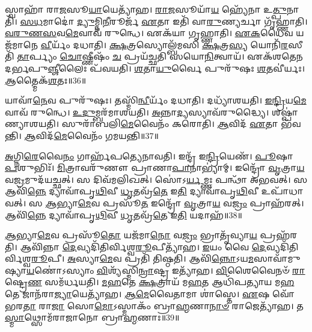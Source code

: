 𑌸𑍍𑌵𑌾𑌹𑌾᳴ 𑌰𑌾\-\ul{𑌜}\-𑌸𑍂\-\ul{𑌯𑌾}\-𑌯𑍇𑌤𑍍𑌯𑌾᳴𑌹।
\-\ul{𑌰𑌾}\-\-\ul{𑌜}\-𑌸𑍂𑌯𑌾᳴\-\ul{𑌯} 𑌹𑍍𑌯𑍇᳴𑌨𑌾 𑌉\-\ul{𑌤𑍍𑌪𑍁}\-𑌨𑌾𑌤𑌿᳴।
\-\ul{𑌸}\-\-\ul{𑌧}\-𑌮𑌾𑌦𑍋॑ \ul{𑌦𑍍𑌯𑍁}\-𑌮𑍍𑌨𑌿\-\ul{𑌨𑍀}\-𑌰𑍂𑌰𑍍𑌜᳴ \ul{𑌏}\-𑌤𑌾 𑌇𑌤𑌿᳴ 𑌵𑌾\-\ul{𑌰𑍁}\-𑌣𑍍𑌯𑌰𑍍𑌚𑌾 𑌗𑍃᳴𑌹𑍍𑌣𑌾𑌤𑌿।
\-\ul{𑌵}\-\-\ul{𑌰𑍁}\-\-\ul{𑌣}\-\-\ul{𑌸}\-𑌵\-\ul{𑌮𑍇}\-𑌵𑌾𑌵᳴ 𑌰𑍁𑌨𑍍𑌧𑍇।
𑌏𑌕᳴𑌯𑌾 𑌗𑍃𑌹𑍍𑌣𑌾𑌤𑌿।
\-\ul{𑌏}\-\-\ul{𑌕}\-𑌧𑍈𑌵 𑌯𑌜᳴𑌮𑌾𑌨𑍇 \ul{𑌵𑍀}\-𑌰𑍍𑌯𑌂᳴ 𑌦𑌧𑌾𑌤𑌿।
\-\ul{𑌕𑍍𑌷}\-𑌤𑍍𑌰𑌸𑍍𑌯𑍋𑌲𑍍𑌬᳴𑌮𑌸𑌿 \ul{𑌕𑍍𑌷}\-𑌤𑍍𑌰\-\ul{𑌸𑍍𑌯} 𑌯𑍋𑌨𑌿᳴\-\ul{𑌰}\-𑌸𑍀𑌤𑌿᳴ \ul{𑌤𑌾}\-𑌰𑍍𑌪𑍍𑌯𑌂 \ul{𑌚𑍋}\-𑌷𑍍𑌣𑍀𑌷𑌂᳴ \ul{𑌚} 𑌪𑍍𑌰𑌯᳴𑌚𑍍𑌛𑌤𑌿 𑌸𑌯𑍋\-\ul{𑌨𑌿}\-𑌤𑍍𑌵𑌾𑌯᳴।
𑌏𑌕᳴𑌶𑌤𑍇𑌨 𑌦𑌰𑍍𑌭𑌪𑍁\-\ul{𑌞𑍍𑌜𑍀}\-𑌲𑍈𑌃 𑌪᳴𑌵𑌯𑌤𑌿।
\-\ul{𑌶}\-𑌤𑌾\-\ul{𑌯𑍁}\-𑌰𑍍𑌵𑍈 𑌪𑍁𑌰𑍁᳴𑌷𑌃 \ul{𑌶}\-𑌤𑌵𑍀॑𑌰𑍍𑌯𑌃।
\-\ul{𑌆}\-𑌤𑍍𑌮𑍈𑌕᳴\-\ul{𑌶}\-𑌤𑌃॥36॥

𑌯𑌾𑌵𑌾᳴\-\ul{𑌨𑍇}\-𑌵 𑌪𑍁𑌰𑍁᳴𑌷𑌃।
𑌤𑌸𑍍𑌮𑌿᳴\-\ul{𑌨𑍍𑌵𑍀}\-𑌰𑍍𑌯𑌂᳴ 𑌦𑌧𑌾𑌤𑌿।
𑌦𑌧𑍍𑌯𑌾᳴𑌶𑌯𑌤𑌿।
\-\ul{𑌇}\-\-\ul{𑌨𑍍𑌦𑍍𑌰𑌿}\-𑌯\-\ul{𑌮𑍇}\-𑌵𑌾𑌵᳴ 𑌰𑍁𑌨𑍍𑌧𑍇।
\-\ul{𑌉}\-\-\ul{𑌦𑍁}\-𑌮𑍍𑌬𑌰᳴𑌮𑌾𑌶𑌯𑌤𑌿।
\-\ul{𑌅}\-𑌨𑍍𑌨𑌾\-\ul{𑌦𑍍𑌯}\-𑌸𑍍𑌯𑌾𑌵᳴𑌰𑍁𑌦𑍍𑌧𑍍𑌯𑍈।
𑌶𑌷𑍍𑌪𑌾॑𑌣𑍍𑌯𑌾𑌶𑌯𑌤𑌿।
𑌸𑍁𑌰𑌾᳴𑌬𑌲𑌿\-\ul{𑌮𑍇}\-𑌵𑍈𑌨𑌂᳴ 𑌕𑌰𑍋𑌤𑌿।
\-\ul{𑌆}\-𑌵𑌿𑌦᳴ \ul{𑌏}\-𑌤𑌾 𑌭᳴𑌵𑌨𑍍𑌤𑌿।
\-\ul{𑌆}\-𑌵𑌿𑌦᳴\-\ul{𑌮𑍇}\-𑌵𑍈𑌨𑌂᳴ 𑌗𑌮𑌯𑌨𑍍𑌤𑌿॥37॥

\-\ul{𑌅}\-𑌗𑍍𑌨𑌿\-\ul{𑌰𑍇}\-𑌵𑍈\-\ul{𑌨𑌂} 𑌗𑌾𑌰𑍍\mbox{}𑌹᳴𑌪𑌤𑍍𑌯𑍇𑌨𑌾𑌵𑌤𑌿।
𑌇𑌨𑍍𑌦𑍍𑌰᳴ 𑌇\-\ul{𑌨𑍍𑌦𑍍𑌰𑌿}\-𑌯𑍇𑌣᳴।
\-\ul{𑌪𑍂}\-𑌷𑌾 \ul{𑌪}\-𑌶𑍁𑌭𑌿𑌃᳴।
\-\ul{𑌮𑌿}\-𑌤𑍍𑌰𑌾𑌵𑌰𑍁᳴𑌣𑍗 𑌪𑍍𑌰𑌾𑌣𑌾\-\ul{𑌪𑌾}\-𑌨𑌾𑌭𑍍𑌯𑌾॑𑌮𑍍।
𑌇𑌨𑍍𑌦𑍍𑌰𑍋᳴ \ul{𑌵𑍃}\-𑌤𑍍𑌰𑌾\-\ul{𑌯} 𑌵\-\ul{𑌜𑍍𑌰}\-𑌮𑍁𑌦᳴𑌯𑌚𑍍𑌛𑌤𑍍।
𑌸 𑌦𑌿𑌵᳴𑌮𑌲𑌿𑌖𑌤𑍍।
𑌸𑍋॑𑌽\-\ul{𑌰𑍍𑌯}\-𑌮𑍍𑌣𑌃 𑌪𑌨𑍍𑌥𑌾᳴ 𑌅𑌭𑌵𑌤𑍍।
𑌸 𑌆𑌵𑌿᳴\-\ul{𑌨𑍍𑌨𑍇} 𑌦𑍍𑌯𑌾𑌵𑌾᳴𑌪𑍃\-\ul{𑌥𑌿}\-𑌵𑍀 \ul{𑌧𑍃}\-𑌤𑌵𑍍𑌰᳴\-\ul{𑌤𑍇} 𑌇\-\ul{𑌤𑌿} 𑌦𑍍𑌯𑌾𑌵𑌾᳴𑌪𑍃\-\ul{𑌥𑌿}\-𑌵𑍀 𑌉𑌪𑌾᳴𑌧𑌾𑌵𑌤𑍍।
𑌸 \ul{𑌆}\-𑌭𑍍𑌯𑌾\-\ul{𑌮𑍇}\-𑌵 𑌪𑍍𑌰𑌸𑍂᳴\-\ul{𑌤} 𑌇𑌨𑍍𑌦𑍍𑌰𑍋᳴ \ul{𑌵𑍃}\-𑌤𑍍𑌰𑌾\-\ul{𑌯} 𑌵\-\ul{𑌜𑍍𑌰𑌂} 𑌪𑍍𑌰𑌾𑌹᳴𑌰𑌤𑍍।
𑌆𑌵𑌿᳴\-\ul{𑌨𑍍𑌨𑍇} 𑌦𑍍𑌯𑌾𑌵𑌾᳴𑌪𑍃\-\ul{𑌥𑌿}\-𑌵𑍀 \ul{𑌧𑍃}\-𑌤𑌵𑍍𑌰᳴\-\ul{𑌤𑍇} 𑌇\-\ul{𑌤𑌿} 𑌯𑌦𑌾𑌹᳴॥38॥

\-\ul{𑌆}\-𑌭𑍍𑌯𑌾\-\ul{𑌮𑍇}\-𑌵 𑌪𑍍𑌰𑌸𑍂᳴\-\ul{𑌤𑍋} 𑌯𑌜᳴𑌮𑌾\-\ul{𑌨𑍋} 𑌵\-\ul{𑌜𑍍𑌰𑌂} 𑌭𑍍𑌰𑌾𑌤𑍃᳴𑌵𑍍𑌯𑌾\-\ul{𑌯} 𑌪𑍍𑌰𑌹᳴𑌰𑌤𑌿।
𑌆𑌵𑌿᳴𑌨𑍍𑌨𑌾 \ul{𑌦𑍇}\-𑌵𑍍𑌯𑌦𑌿᳴𑌤𑌿𑌰𑍍𑌵𑌿𑌶𑍍𑌵\-\ul{𑌰𑍂}\-𑌪𑍀𑌤𑍍𑌯𑌾᳴𑌹।
\-\ul{𑌇}\-𑌯𑌂 𑌵𑍈 \ul{𑌦𑍇}\-𑌵𑍍𑌯𑌦𑌿᳴𑌤𑌿𑌰𑍍𑌵𑌿𑌶𑍍𑌵\-\-\ul{𑌰𑍂}\-𑌪𑍀।
\-\ul{𑌅}\-𑌸𑍍𑌯𑌾\-\ul{𑌮𑍇}\-𑌵 𑌪𑍍𑌰𑌤𑌿᳴ 𑌤𑌿𑌷𑍍𑌠𑌤𑌿।
𑌆𑌵𑌿᳴\-\ul{𑌨𑍍𑌨𑍋}\-\-𑌽𑌯\-\ul{𑌮}\-𑌸𑌾𑌵𑌾᳴𑌮𑍁𑌷𑍍𑌯𑌾\-\-\ul{𑌯}\-𑌣𑍋॑\-𑌽𑌸𑍍𑌯𑌾𑌂 \ul{𑌵𑌿}\-𑌶𑍍𑌯᳴𑌸𑍍𑌮𑌿\-\ul{𑌨𑍍𑌰𑌾}\-𑌷𑍍𑌟𑍍𑌰 𑌇𑌤𑍍𑌯𑌾᳴𑌹।
\-\ul{𑌵𑌿}\-𑌶𑍈𑌵𑍈𑌨𑍞᳴ \ul{𑌰𑌾}\-𑌷𑍍𑌟𑍍𑌰𑍇\-\ul{𑌣} 𑌸𑌮᳴𑌰𑍍𑌧𑌯𑌤𑌿।
\-\ul{𑌮}\-\-\ul{𑌹}\-𑌤𑍇 \ul{𑌕𑍍𑌷}\-𑌤𑍍𑌰𑌾𑌯᳴ 𑌮\-\ul{𑌹}\-𑌤 𑌆𑌧𑌿᳴𑌪𑌤𑍍𑌯𑌾𑌯 𑌮\-\ul{𑌹}\-𑌤𑍇 𑌜𑌾𑌨᳴𑌰𑌾\-\ul{𑌜𑍍𑌯𑌾}\-𑌯𑍇𑌤𑍍𑌯𑌾᳴𑌹।
\-\ul{𑌆}\-\-\-\ul{𑌮𑍇}\-𑌵𑍈𑌤𑌾𑌮𑌾 𑌶𑌾॑𑌸𑍍𑌤𑍇।
\-\ul{𑌏}\-𑌷 𑌵𑍋᳴ 𑌭𑌰\-\ul{𑌤𑌾} 𑌰𑌾\-\ul{𑌜𑌾} 𑌸𑍋\-\ul{𑌮𑍋}\-\-𑌽𑌸𑍍𑌮𑌾𑌕𑌂᳴ 𑌬𑍍𑌰𑌾\-\ul{𑌹𑍍𑌮}\-𑌣𑌾\-\ul{𑌨𑌾}\-\-\ul{𑍞} 𑌰𑌾𑌜𑍇𑌤𑍍𑌯𑌾᳴𑌹।
𑌤\-\ul{𑌸𑍍𑌮𑌾}\-𑌥𑍍𑌸𑍋𑌮᳴𑌰𑌾𑌜𑌾𑌨𑍋 𑌬𑍍𑌰𑌾\-\ul{𑌹𑍍𑌮}\-𑌣𑌾𑌃॥39॥

